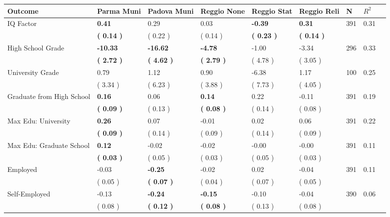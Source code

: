 \begin{tabular}{L{6.2cm} C{1.8cm} C{1.8cm} C{1.8cm} C{1.8cm} C{1.8cm} C{1.8cm} C{0.3cm} C{0.3cm}}
\toprule
 \textbf{Outcome} & \textbf{Parma Muni} & \textbf{Padova Muni} & \textbf{Reggio None} & \textbf{Reggio Stat} & \textbf{Reggio Reli} & \textbf{N} & \textbf{$ R^2$} \\
\midrule
IQ Factor & \textbf{     0.41} &      0.29 &      0.03 & \textbf{    -0.39} & \textbf{     0.31}  & 391 &       0.31 \\ 
 & \textbf{(     0.14 )} & (     0.22 ) & (     0.14 ) & \textbf{(     0.23 )} & \textbf{(     0.14 )}  & \\
High School Grade & \textbf{   -10.33} & \textbf{   -16.62} & \textbf{    -4.78} &     -1.00 &     -3.34  & 296 &       0.33 \\ 
 & \textbf{(     2.72 )} & \textbf{(     4.62 )} & \textbf{(     2.79 )} & (     4.78 ) & (     3.05 )  & \\
University Grade &      0.79 &      1.12 &      0.90 &     -6.38 &      1.17  & 100 &       0.25 \\ 
 & (     3.34 ) & (     6.23 ) & (     3.88 ) & (     7.73 ) & (     4.05 )  & \\
Graduate from High School & \textbf{     0.16} &      0.06 & \textbf{     0.14} &      0.22 &     -0.11  & 391 &       0.19 \\ 
 & \textbf{(     0.09 )} & (     0.13 ) & \textbf{(     0.08 )} & (     0.14 ) & (     0.08 )  & \\
Max Edu: University & \textbf{     0.26} &      0.07 &     -0.01 &      0.02 &      0.06  & 391 &       0.22 \\ 
 & \textbf{(     0.09 )} & (     0.14 ) & (     0.09 ) & (     0.14 ) & (     0.09 )  & \\
Max Edu: Graduate School & \textbf{     0.12} &     -0.02 &     -0.02 &     -0.00 &     -0.00  & 391 &       0.11 \\ 
 & \textbf{(     0.03 )} & (     0.05 ) & (     0.03 ) & (     0.05 ) & (     0.03 )  & \\
Employed &     -0.03 & \textbf{    -0.25} &     -0.02 &      0.02 &     -0.04  & 391 &       0.11 \\ 
 & (     0.05 ) & \textbf{(     0.07 )} & (     0.04 ) & (     0.07 ) & (     0.05 )  & \\
Self-Employed &     -0.13 & \textbf{    -0.24} & \textbf{    -0.15} &     -0.10 &     -0.04  & 390 &       0.06 \\ 
 & (     0.08 ) & \textbf{(     0.12 )} & \textbf{(     0.08 )} & (     0.13 ) & (     0.08 )  & \\

\end{tabular}
